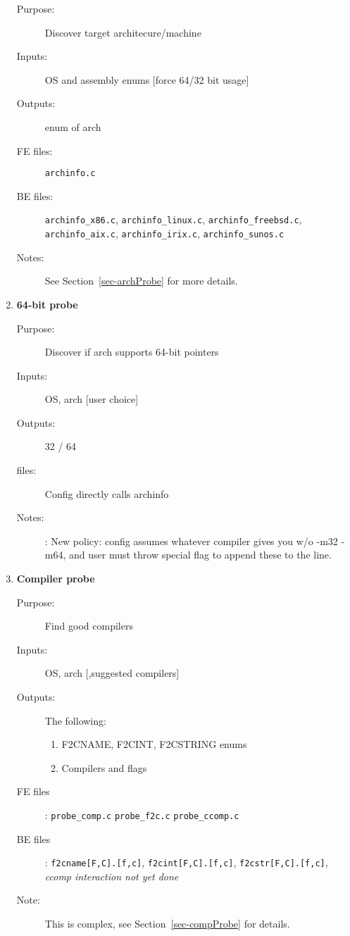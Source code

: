 \documentclass[11pt]{article}
\begin{document}
\begin{enumerate}
   \begin{description}
   \item [Purpose:] Discover target architecure/machine
   \item [Inputs:]  OS and assembly enums [force 64/32 bit usage]
   \item [Outputs:] enum of arch
   \item [FE files:] {\tt archinfo.c}
   \item [BE files:] {\tt archinfo\_x86.c}, {\tt archinfo\_linux.c}, 
         {\tt archinfo\_freebsd.c}, {\tt archinfo\_aix.c},
         {\tt archinfo\_irix.c}, {\tt archinfo\_sunos.c}
   \item [Notes:] See Section~\ref{sec-archProbe} for more details.
   \end{description}
\item {\bf 64-bit probe}
   \begin{description}
   \item [Purpose:] Discover if arch supports 64-bit pointers
   \item [Inputs:]  OS, arch [user choice]
   \item [Outputs:] 32 / 64
   \item [files:] Config directly calls archinfo
   \item [Notes:]: New policy: config assumes whatever compiler gives you w/o
                   -m32 -m64, and user must throw special flag to append these
                   to the line.
   \end{description}
\item {\bf Compiler probe}
   \begin{description}
   \item [Purpose:] Find good compilers
   \item [Inputs:]  OS, arch [,suggested compilers]
   \item [Outputs:] The following:
      \begin{enumerate}
      \item F2CNAME, F2CINT, F2CSTRING enums
      \item Compilers and flags
      \end{enumerate}
   \item [FE files]: {\tt probe\_comp.c} {\tt probe\_f2c.c} {\tt probe\_ccomp.c}
   \item [BE files]: {\tt f2cname[F,C].[f,c]}, {\tt f2cint[F,C].[f,c]},  
                     {\tt f2cstr[F,C].[f,c]}, 
                     {\it ccomp interaction not yet done}
   \item [Note:] This is complex, see Section~\ref{sec-compProbe} for details.

\end{description}
\end{enumerate}
\end{document}
